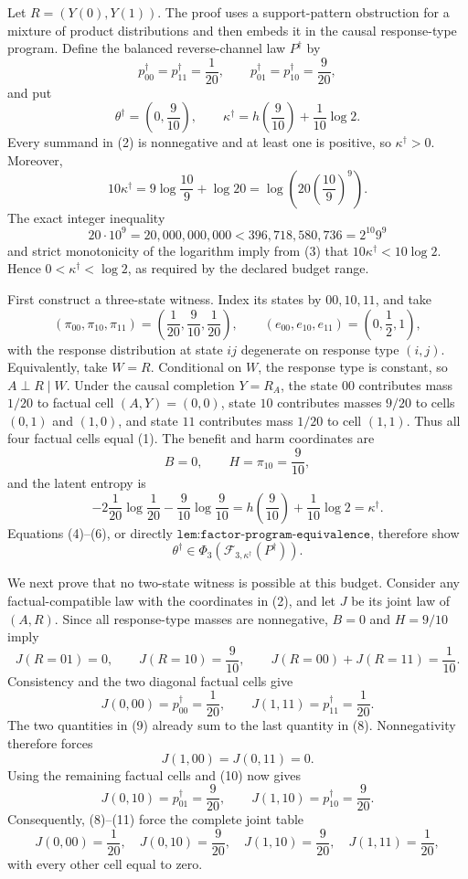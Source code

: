 Let \(R=(Y(0),Y(1))\).  The proof uses a support-pattern obstruction for a
mixture of product distributions and then embeds it in the causal response-type
program.  Define the balanced reverse-channel law \(P^\dagger\) by
\[
 p^\dagger_{00}=p^\dagger_{11}=\frac1{20},
 \qquad
 p^\dagger_{01}=p^\dagger_{10}=\frac9{20},
 \tag{1}
\]
and put
\[
 \theta^\dagger=\left(0,\frac9{10}\right),
 \qquad
 \kappa^\dagger=h\!\left(\frac9{10}\right)
       +\frac1{10}\log2.
 \tag{2}
\]
Every summand in (2) is nonnegative and at least one is positive, so
\(\kappa^\dagger>0\).  Moreover,
\[
 10\kappa^\dagger
 =9\log\frac{10}{9}+\log20
 =\log\!\left(20\left(\frac{10}{9}\right)^9\right).
 \tag{3}
\]
The exact integer inequality
\[
 20\cdot10^9=20{,}000{,}000{,}000
 <396{,}718{,}580{,}736=2^{10}9^9
\]
and strict monotonicity of the logarithm imply from (3) that
\(10\kappa^\dagger<10\log2\).  Hence
\(0<\kappa^\dagger<\log2\), as required by the declared budget range.

First construct a three-state witness.  Index its states by
\(00,10,11\), and take
\[
 (\pi_{00},\pi_{10},\pi_{11})
 =\left(\frac1{20},\frac9{10},\frac1{20}\right),
 \qquad
 (e_{00},e_{10},e_{11})=\left(0,\frac12,1\right),
 \tag{4}
\]
with the response distribution at state \(ij\) degenerate on response type
\((i,j)\).  Equivalently, take \(W=R\).  Conditional on \(W\), the response
type is constant, so \(A\perp R\mid W\).  Under the causal completion
\(Y=R_A\), the state \(00\) contributes mass \(1/20\) to factual cell
\((A,Y)=(0,0)\), state \(10\) contributes masses \(9/20\) to cells
\((0,1)\) and \((1,0)\), and state \(11\) contributes mass \(1/20\) to
cell \((1,1)\).  Thus all four factual cells equal (1).  The benefit and
harm coordinates are
\[
 B=0,
 \qquad
 H=\pi_{10}=\frac9{10},
 \tag{5}
\]
and the latent entropy is
\[
 -2\frac1{20}\log\frac1{20}
 -\frac9{10}\log\frac9{10}
 =h\!\left(\frac9{10}\right)+\frac1{10}\log2
 =\kappa^\dagger.
 \tag{6}
\]
Equations (4)--(6), or directly
\(\texttt{lem:factor-program-equivalence}\), therefore show
\[
 \theta^\dagger\in
 \Phi_3(\mathcal F_{3,\kappa^\dagger}(P^\dagger)).
 \tag{7}
\]

We next prove that no two-state witness is possible at this budget.  Consider
any factual-compatible law with the coordinates in (2), and let \(J\) be its
joint law of \((A,R)\).  Since all response-type masses are nonnegative,
\(B=0\) and \(H=9/10\) imply
\[
 J(R=01)=0,
 \qquad J(R=10)=\frac9{10},
 \qquad J(R=00)+J(R=11)=\frac1{10}.
 \tag{8}
\]
Consistency and the two diagonal factual cells give
\[
 J(0,00)=p^\dagger_{00}=\frac1{20},
 \qquad
 J(1,11)=p^\dagger_{11}=\frac1{20}.
 \tag{9}
\]
The two quantities in (9) already sum to the last quantity in (8).
Nonnegativity therefore forces
\[
 J(1,00)=J(0,11)=0.
 \tag{10}
\]
Using the remaining factual cells and (10) now gives
\[
 J(0,10)=p^\dagger_{01}=\frac9{20},
 \qquad
 J(1,10)=p^\dagger_{10}=\frac9{20}.
 \tag{11}
\]
Consequently, (8)--(11) force the complete joint table
\[
 J(0,00)=\frac1{20},\quad
 J(0,10)=\frac9{20},\quad
 J(1,10)=\frac9{20},\quad
 J(1,11)=\frac1{20},
 \tag{12}
\]
with every other cell equal to zero.

